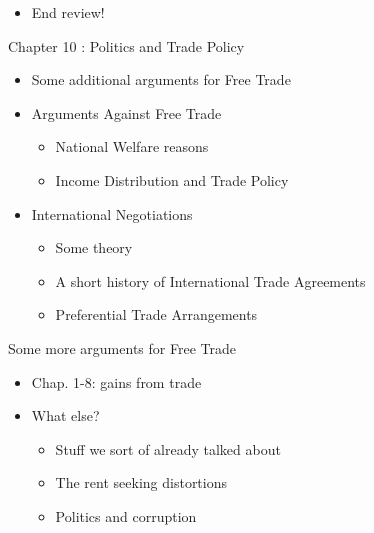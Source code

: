 \documentclass{beamer}
\begin{document}
\begin{frame}

    \begin{itemize}
        \item End review!
    \end{itemize}

\end{frame}

\begin{frame}{Chapter 10 : Politics and Trade Policy}

    \begin{itemize}
        \item Some additional arguments for Free Trade
        \item Arguments Against Free Trade
        \begin{itemize}
            \item National Welfare reasons 
            \item Income Distribution and Trade Policy
        \end{itemize}
        \item International Negotiations
        \begin{itemize}
            \item Some theory
            \item A short history of International Trade Agreements 
            \item Preferential Trade Arrangements
        \end{itemize}
    \end{itemize}

\end{frame}

\begin{frame}{Some more arguments for Free Trade}

\begin{itemize}
    \item Chap. 1-8: gains from trade
    \item What else?
    \begin{itemize}
        \item Stuff we sort of already talked about
        \item The rent seeking distortions
        \item Politics and corruption
    \end{itemize}
\end{itemize}

\end{frame}
\end{document}

